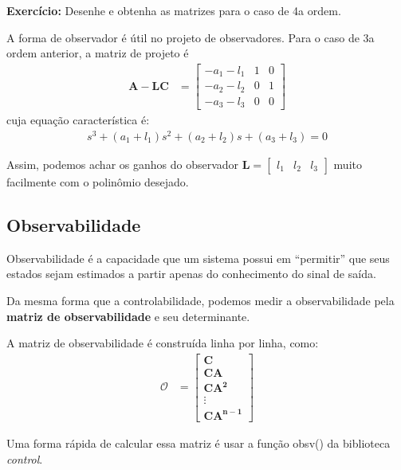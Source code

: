 \documentclass[
]{book}
\begin{document}
\textbf{Exercício:} Desenhe e obtenha as matrizes para o caso de 4a ordem.

A forma de observador é útil no projeto de observadores. Para o caso de
3a ordem anterior, a matriz de projeto é \[
\begin{align*}
\mathbf{A-LC} &= \left[
        \begin{array}{rrr}
        -a_1-l_1 & 1 & 0\\
        -a_2-l_2 & 0 & 1\\
        -a_3-l_3 & 0 & 0\end{array}
    \right]
\end{align*}
\] cuja equação característica é: \[
\begin{align*}
s^3+(a_1+l_1)s^2+(a_2+l_2)s+(a_3+l_3)=0
\end{align*}
\]

Assim, podemos achar os ganhos do observador
\(\mathbf{L}=\left[\begin{array}{ccc} l_1 & l_2 & l_3\end{array} \right]\)
muito facilmente com o polinômio desejado.

\hypertarget{observabilidade}{%
\subsection{Observabilidade}\label{observabilidade}}

Observabilidade é a capacidade que um sistema possui em ``permitir'' que
seus estados sejam estimados a partir apenas do conhecimento do sinal de
saída.

Da mesma forma que a controlabilidade, podemos medir a observabilidade
pela \textbf{matriz de observabilidade} e seu determinante.

A matriz de observabilidade é construída linha por linha, como: \[
\begin{align*}
\mathbf{\mathcal{O}} &= \left[
        \begin{array}{c}
        \mathbf{C}\\
        \mathbf{CA}\\
        \mathbf{CA^2}\\
        \vdots\\
        \mathbf{CA^{n-1}}
        \end{array}
    \right]
\end{align*}
\]

Uma forma rápida de calcular essa matriz é usar a função obsv() da
biblioteca \emph{control}.
\end{document}
